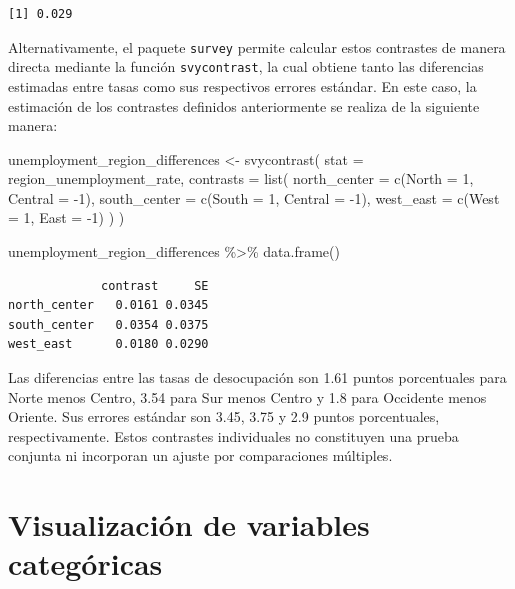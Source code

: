 \documentclass[
  spanish,
  11pt,
  letterpaper,
  oneside,
  open=any]{scrbook}
\newenvironment{Shaded}{\begin{snugshade}}{\end{snugshade}}
\newcommand{\AttributeTok}[1]{\textcolor[rgb]{0.40,0.45,0.13}{#1}}
\newcommand{\DecValTok}[1]{\textcolor[rgb]{0.68,0.00,0.00}{#1}}
\newcommand{\FunctionTok}[1]{\textcolor[rgb]{0.28,0.35,0.67}{#1}}
\newcommand{\NormalTok}[1]{\textcolor[rgb]{0.00,0.23,0.31}{#1}}
\newcommand{\OtherTok}[1]{\textcolor[rgb]{0.00,0.23,0.31}{#1}}
\newcommand{\SpecialCharTok}[1]{\textcolor[rgb]{0.37,0.37,0.37}{#1}}
\begin{document}
\begin{verbatim}
[1] 0.029
\end{verbatim}

Alternativamente, el paquete \texttt{survey} permite calcular estos
contrastes de manera directa mediante la función \texttt{svycontrast},
la cual obtiene tanto las diferencias estimadas entre tasas como sus
respectivos errores estándar. En este caso, la estimación de los
contrastes definidos anteriormente se realiza de la siguiente manera:

\begin{Shaded}
\begin{Highlighting}[]
\NormalTok{unemployment\_region\_differences }\OtherTok{\textless{}{-}} \FunctionTok{svycontrast}\NormalTok{(}
  \AttributeTok{stat =}\NormalTok{ region\_unemployment\_rate,}
  \AttributeTok{contrasts =} \FunctionTok{list}\NormalTok{(}
    \AttributeTok{north\_center =} \FunctionTok{c}\NormalTok{(}\AttributeTok{North =} \DecValTok{1}\NormalTok{, }\AttributeTok{Central =} \SpecialCharTok{{-}}\DecValTok{1}\NormalTok{),}
    \AttributeTok{south\_center =} \FunctionTok{c}\NormalTok{(}\AttributeTok{South =} \DecValTok{1}\NormalTok{, }\AttributeTok{Central =} \SpecialCharTok{{-}}\DecValTok{1}\NormalTok{),}
    \AttributeTok{west\_east =} \FunctionTok{c}\NormalTok{(}\AttributeTok{West =} \DecValTok{1}\NormalTok{, }\AttributeTok{East =} \SpecialCharTok{{-}}\DecValTok{1}\NormalTok{)}
\NormalTok{  )}
\NormalTok{)}

\NormalTok{unemployment\_region\_differences }\SpecialCharTok{\%\textgreater{}\%}
  \FunctionTok{data.frame}\NormalTok{()}
\end{Highlighting}
\end{Shaded}

\begin{verbatim}
             contrast     SE
north_center   0.0161 0.0345
south_center   0.0354 0.0375
west_east      0.0180 0.0290
\end{verbatim}

Las diferencias entre las tasas de desocupación son 1.61 puntos
porcentuales para Norte menos Centro, 3.54 para Sur menos Centro y 1.8
para Occidente menos Oriente. Sus errores estándar son 3.45, 3.75 y 2.9
puntos porcentuales, respectivamente. Estos contrastes individuales no
constituyen una prueba conjunta ni incorporan un ajuste por
comparaciones múltiples.

\section{Visualización de variables
categóricas}\label{sec-viz-categoricas}
\end{document}
